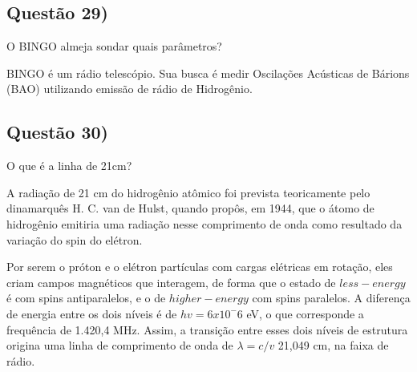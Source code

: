 \documentclass{article}
\begin{document}
\subsection*{Questão 29)}
\begin{boxx}
O BINGO almeja sondar quais parâmetros?
\end{boxx}
BINGO é um rádio telescópio. Sua busca é medir Oscilações Acústicas de Bárions (BAO) utilizando emissão de rádio de Hidrogênio. 

\subsection*{Questão 30)}
\begin{boxx}
O que é a linha de 21cm?
\end{boxx}
 A radiação de 21 cm do hidrogênio atômico foi
prevista teoricamente pelo dinamarquês H. C. van de Hulst,
quando propôs, em 1944, que o átomo de hidrogênio emitiria
uma radiação nesse comprimento de onda como resultado
da variação do spin do elétron.

Por serem o próton e o elétron partículas com cargas elétricas em rotação, eles criam campos magnéticos que interagem,
de forma que o estado de $less-energy$ é com spins
antiparalelos, e o de $higher-energy$ com spins paralelos. A
diferença de energia entre os dois níveis é de $hv = 6 x 10^-6$ eV,
o que corresponde a frequência de 1.420,4 MHz. Assim,
a transição entre esses dois níveis de estrutura origina uma linha de comprimento de onda de $\lambda =c/v$ 21,049 cm, na faixa de rádio.




 
    
\end{document}
